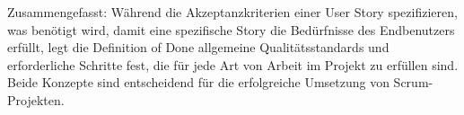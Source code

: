 \documentclass[main.tex]{subfiles}
\begin{document}
Zusammengefasst: Während die Akzeptanzkriterien einer User Story spezifizieren, was benötigt wird, damit eine spezifische Story die Bedürfnisse des Endbenutzers erfüllt, legt die Definition of Done allgemeine Qualitätsstandards und erforderliche Schritte fest, die für jede Art von Arbeit im Projekt zu erfüllen sind. Beide Konzepte sind entscheidend für die erfolgreiche Umsetzung von Scrum-Projekten.
\end{document}
